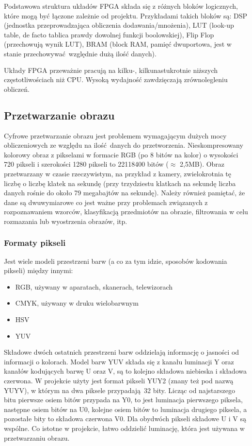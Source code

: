\documentclass[12pt, oneside]{article}
\begin{document}
Podstawowa struktura układów FPGA składa się z różnych bloków logicznych,
które mogą być łączone zależnie od projektu. Przykładami takich bloków są:
DSP (jednostka przeprowadzająca obliczenia dodawania/mnożenia),
LUT (look-up table, de facto tablica prawdy dowolnej funkcji boolowskiej),
Flip Flop (przechowują wynik LUT), BRAM (block RAM, pamięć dwuportowa,
jest w stanie przechowywać względnie dużą ilość danych).

Układy FPGA przeważnie pracują na kilku-, kilkunastukrotnie niższych
częstotliwościach niż CPU.  Wysoką wydajność zawdzięczają
zrównolegleniu obliczeń.

\subsection{Przetwarzanie obrazu}
Cyfrowe przetwarzanie obrazu jest problemem wymagającym dużych mocy
obliczeniowych ze względu na ilość danych do przetworzenia. Nieskompresowany
kolorowy obraz z pikselami w formacie RGB (po 8 bitów na kolor) o wysokości
720 pikseli i szerokości 1280 pikseli to 22118400 bitów (\(\approx \) 2,5MB). Obraz
przetwarzany w czasie rzeczywistym, na przykład z kamery, zwielokrotnia tę
liczbę o liczbę klatek na sekundę (przy trzydziestu klatkach na sekundę liczba
danych rośnie do około 79 megabajtów na sekundę). Należy również pamiętać, że
dane są dwuwymiarowe co jest ważne przy problemach związanych z rozpoznawaniem
wzorców, klasyfikacją przedmiotów na obrazie, filtrowania w celu rozmazania lub
wyostrzenia obrazów, itp.

\subsubsection{Formaty pikseli}
Jest wiele modeli przestrzeni barw (a co za tym idzie, sposobów kodowania
pikseli) między innymi:
\begin{itemize}
  \item RGB, używany w aparatach, skanerach, telewizorach
  \item CMYK, używany w druku wielobarwnym
  \item HSV
  \item YUV
\end{itemize}
Składowe dwóch ostatnich przestrzeni barw oddzielają informację o jasności
od informacji o kolorach. Model barw YUV składa się z kanału luminacji Y
oraz kanałów kodujących barwę U oraz V, są to kolejno składowa niebieska
i składowa czerwona. W projekcie użyty jest format pikseli YUY2 (znany też
pod nazwą YUYV), w którym na dwa piksele przypadają 32 bity.
Licząc od najstarszego bitu pierwsze osiem bitów przypada na Y0, to jest
luminacja pierwszego piksela, następne osiem bitów na U0, kolejne osiem bitów
to luminacja drugiego piksela, a pozostałe bity to składowa czerwona V0.
Dla obydwóch pikseli składowe U i V są wspólne. Co istotne w projekcie,
łatwo oddzielić luminację, która jest używana w przetwarzaniu obrazu.
\end{document}
